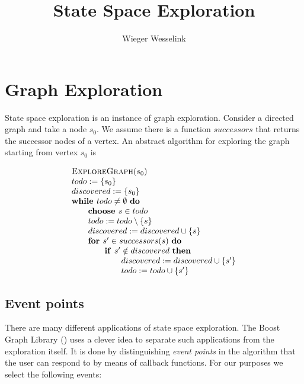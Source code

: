 \documentclass{article}
\title{State Space Exploration}
\author{Wieger Wesselink}
\newcommand{\Space}{\text{\ }}
\newcommand{\If}{\text{\textbf{if }}}
\newcommand{\Do}{\text{\textbf{do }}}
\newcommand{\Then}{\text{\textbf{then }}}
\newcommand{\For}{\text{\textbf{for }}}
\newcommand{\While}{\text{\textbf{while }}}
\newcommand{\Choose}{\text{\textbf{choose }}}
\begin{document}
\maketitle

\section{Graph Exploration}

State space exploration is an instance of graph exploration. Consider a directed graph
and take a node $s_0$. We assume there is a function $successors$ that returns the successor
nodes of a vertex. An abstract algorithm for exploring the graph starting from vertex
$s_0$ is

\[
\begin{tabular}{l}
\textsc{ExploreGraph}($s_0$) \\
$todo := \{ s_0 \}$ \\
$discovered := \{ s_0 \}$ \\
$\While todo \neq \emptyset \Space \Do$ \\
\qquad \Choose $s \in todo$ \\
\qquad $todo := todo \setminus \{s\}$ \\
\qquad $discovered := discovered \cup \{s\}$ \\
\qquad $\For s' \in successors(s)  \Space \Do$ \\
\qquad \qquad $\If s' \notin discovered \Space \Then$ \\
\qquad \qquad \qquad $discovered := discovered \cup \{s' \}$ \\
\qquad \qquad \qquad $todo := todo \cup \{ s' \}$ \\
\end{tabular}
\]

\subsection{Event points}
There are many different applications of state space exploration. The Boost Graph Library
(\cite{2002:BGL:504206}) uses a clever idea to separate such applications from the exploration
itself. It is done by distinguishing \emph{event points} in the algorithm that the user can respond
to by means of callback functions. For our purposes we select the following events:
\end{document}
